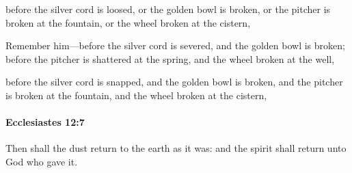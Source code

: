 			\begin{versebox}
					\item[BHS] 
					\item[LXX] 
					\item[ASV] before the silver cord is loosed, or the golden bowl is broken, or the pitcher is broken at the fountain, or the wheel broken at the cistern,
					\item[NIV] Remember him—before the silver cord is severed, and the golden bowl is broken; before the pitcher is shattered at the spring, and the wheel broken at the well,
					\item[NRSV] before the silver cord is snapped, and the golden bowl is broken, and the pitcher is broken at the fountain, and the wheel broken at the cistern,
			\end{versebox}

		\paragraph{Ecclesiastes 12:7} %
			\label{ECCLESIASTES-12-7}

			Then shall the dust return to the earth as it was: and the spirit shall return unto God who gave it.

